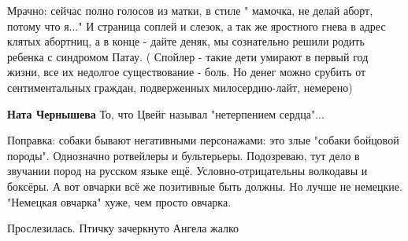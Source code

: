 \begin{itemize}
 

Мрачно: сейчас полно голосов из матки, в стиле " мамочка, не делай аборт,
потому что я..." И страница соплей и слезок, а так же яростного гнева в адрес
клятых абортниц, а в конце - дайте деняк, мы сознательно решили родить ребенка
с синдромом Патау. ( Спойлер - такие дети умирают в первый год жизни, все их
недолгое существование - боль. Но денег можно срубить от сентиментальных
граждан, подверженных милосердию-лайт, немерено)

\begin{itemize}
 
\textbf{Ната Чернышева} То, что Цвейг называл "нетерпением сердца"...
\end{itemize}

 

Поправка: собаки бывают негативными персонажами: это злые "собаки бойцовой
породы". Однозначно ротвейлеры и бультерьеры. Подозреваю, тут дело в звучании
пород на русском языке ещё. Условно-отрицательны волкодавы и боксёры. А вот
овчарки всё же позитивные быть должны. Но лучше не немецкие. "Немецкая овчарка"
хуже, чем просто овчарка.


 
Прослезилась. Птичку зачеркнуто Ангела жалко

 


\end{itemize}
